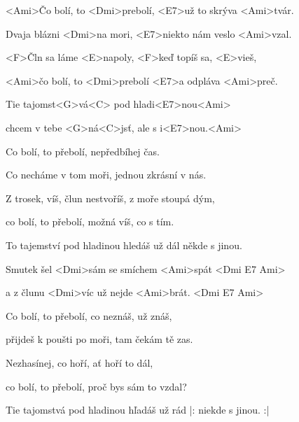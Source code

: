 

\zs
<Ami>Čo bolí, to <Dmi>prebolí, <E7>už to skrýva <Ami>tvár.

Dvaja blázni <Dmi>na mori, <E7>niekto nám veslo <Ami>vzal. 

<F>Čln sa láme <E>napoly, <F>keď topíš sa, <E>vieš, 

<Ami>čo bolí, to <Dmi>prebolí <E7>a odpláva <Ami>preč. 
\ks

\zr
Tie tajomst<G>vá<C> pod hladi<E7>nou<Ami>

chcem v tebe <G>ná<C>jsť, ale s i<E7>nou.<Ami> 
\kr

\zs
Co bolí, to přebolí, nepředbíhej čas.

Co necháme v tom moři, jednou zkrásní v nás. 

Z trosek, víš, člun nestvoříš, z moře stoupá dým, 

co bolí, to přebolí, možná víš, co s tím. 
\ks
 
\zr
To tajemství pod hladinou hledáš už dál někde s jinou. 
\kr
 
\hvezda
Smutek šel <Dmi>sám se smíchem <Ami>spát <Dmi E7 Ami>

a z člunu <Dmi>víc už nejde <Ami>brát. <Dmi E7 Ami>
\ks

\zs
Co bolí, to přebolí, co neznáš, už znáš, 

přijdeš k poušti po moři, tam čekám tě zas. 

Nezhasínej, co hoří, ať hoří to dál, 

co bolí, to přebolí, proč bys sám to vzdal? 
\ks

\zr
Tie tajomstvá pod hladinou hľadáš už rád |: niekde s jinou. :|
\kr

\kp
